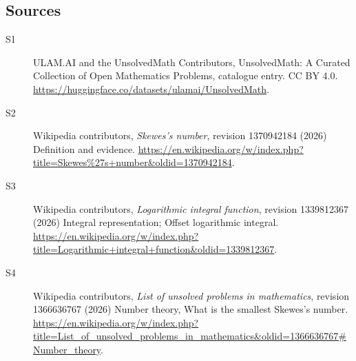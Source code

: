 \documentclass[11pt]{article}
\begin{document}
\subsection{Sources}
\begin{description}
\item[\hypertarget{source:statement:1}{S1}] ULAM.AI and the UnsolvedMath Contributors, UnsolvedMath: A Curated Collection of Open Mathematics Problems, catalogue entry. CC BY 4.0. \url{https://huggingface.co/datasets/ulamai/UnsolvedMath}.
\item[\hypertarget{source:statement:2}{S2}] Wikipedia contributors, \emph{Skewes's number}, revision 1370942184 (2026) Definition and evidence. \url{https://en.wikipedia.org/w/index.php?title=Skewes%27s+number&oldid=1370942184}.
\item[\hypertarget{source:statement:3}{S3}] Wikipedia contributors, \emph{Logarithmic integral function}, revision 1339812367 (2026) Integral representation; Offset logarithmic integral. \url{https://en.wikipedia.org/w/index.php?title=Logarithmic+integral+function&oldid=1339812367}.
\item[\hypertarget{source:statement:4}{S4}] Wikipedia contributors, \emph{List of unsolved problems in mathematics}, revision 1366636767 (2026) Number theory, What is the smallest Skewes's number. \url{https://en.wikipedia.org/w/index.php?title=List_of_unsolved_problems_in_mathematics&oldid=1366636767#Number_theory}.
\end{description}
\label{end:statement}
\end{document}
